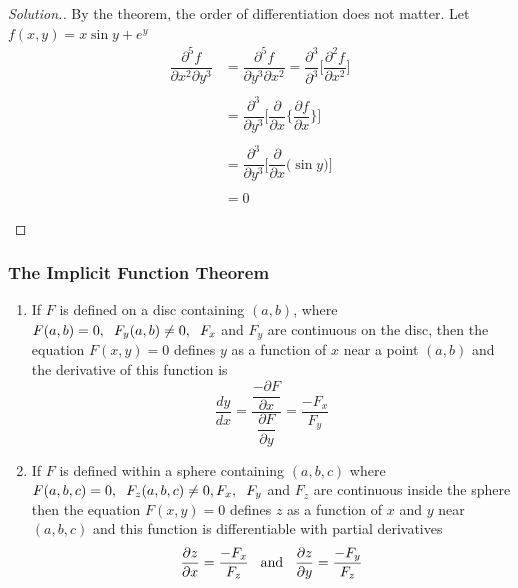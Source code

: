 \documentclass[11pt,a4paper]{article}
\theoremstyle{definition}
\newenvironment{solution}
  {\renewcommand{\qedsymbol}{}\begin{proof}[\textit{Solution}.]}
  {\end{proof}}
\begin{document}
\begin{solution}


By the theorem, the order of differentiation does not matter. Let $f(x,y) = x\sin y + e^y$
\begin{align*}
\dfrac{\partial^5f}{\partial x^2\partial y^3} & = \dfrac{\partial^5f}{\partial y^3\partial x^2}= \dfrac{\partial^3}{\partial^3}\Bigg[\dfrac{\partial^2f}{\partial x^2}\Bigg]\\\\
& = \dfrac{\partial^3}{\partial y^3}\Bigg[\dfrac{\partial}{\partial x}\Bigg\{\dfrac{\partial f}{\partial x}\Bigg\}\Bigg]\\\\
& = \dfrac{\partial^3}{\partial y^3}\Bigg[\dfrac{\partial}{\partial x}\big(\sin y\big)\Bigg]\\\\
& = 0\\\\
\end{align*}
\end{solution}

\subsubsection{The Implicit Function Theorem}
\begin{enumerate}
\item If $F$ is defined on a disc containing $(a,b)$, where $F(a,b) = 0,\hspace{0.2cm} F_y(a,b) \neq 0, \hspace{0.2cm} F_x$ and $F_y$ are continuous on the disc, then the equation $F(x,y) = 0$ defines $y$ as a function of $x$ near a point $(a,b)$ and the derivative of this function is $$\dfrac{dy}{dx} = \dfrac{\dfrac{-\partial F}{\partial x}}{\dfrac{\partial F}{\partial y}} = \dfrac{-F_x}{F_y}$$

\item If $F$ is defined within a sphere containing $(a,b,c)$ where $F(a,b,c) = 0,\hspace{0.2cm} F_z(a,b,c) \neq 0,\hspace{0.2cm}\\ F_x,\hspace{0.2cm} F_y$ and $F_z$ are continuous inside the sphere then the equation $F(x,y) = 0$ defines $z$ as a function of $x$ and $y$ near $(a,b,c)$ and this function is differentiable with partial derivatives
$$\dfrac{\partial z}{\partial x} = \dfrac{-F_x}{F_z} \hspace{0.3cm}\text{and}\hspace{0.3cm} \dfrac{\partial z}{\partial y} = \frac{-F_y}{F_z}$$
\end{enumerate}
\end{document}

